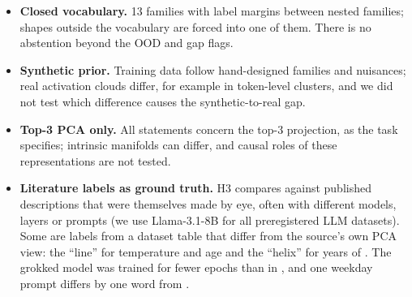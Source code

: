 \begin{itemize}
\item \textbf{Closed vocabulary.} 13 families with label margins between nested families; shapes outside the vocabulary are forced into one of them. There is no abstention beyond the OOD and gap flags.
\item \textbf{Synthetic prior.} Training data follow hand-designed families and nuisances; real activation clouds differ, for example in token-level clusters, and we did not test which difference causes the synthetic-to-real gap.
\item \textbf{Top-3 PCA only.} All statements concern the top-3 projection, as the task specifies; intrinsic manifolds can differ, and causal roles of these representations are not tested.
\item \textbf{Literature labels as ground truth.} H3 compares against published descriptions that were themselves made by eye, often with different models, layers or prompts (we use Llama-3.1-8B for all preregistered LLM datasets). Some are labels from a dataset table that differ from the source's own PCA view: the ``line'' for temperature and age and the ``helix'' for years of \citet{bhalla2026sae}. The grokked model was trained for fewer epochs than in \citet{nanda2023progress}, and one weekday prompt differs by one word from \citet{engels2025notall}.
\end{itemize}
